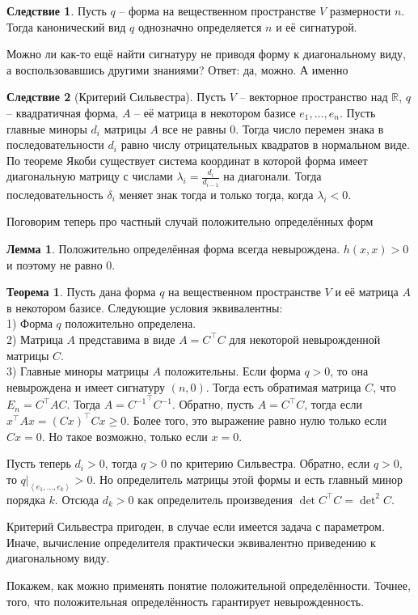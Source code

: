 \documentclass[10pt,a4paper,oneside]{book} %
\theoremstyle{definition}
\newtheorem{thm}{Теорема}
\newtheorem{lem}{Лемма}
\newtheorem{cor}{Следствие}
\newcommand{\mb}[1]{\mathbb{#1}}
\def\lan{\left\langle }
\def\ran{\right\rangle}
\def\thrm{\begin{thm}}
\def\ethrm{\end{thm}}
\def\lm{\begin{lem}}
\def\elm{\end{lem}}
\def\crl{\begin{cor}}
\def\ecrl{\end{cor}}
\begin{document}
\crl Пусть $q$ -- форма на вещественном пространстве  $V$ размерности $n$. Тогда канонический вид $q$ однозначно определяется $n$ и её  сигнатурой. 
\ecrl

Можно ли как-то ещё найти сигнатуру не приводя форму к диагональному виду, а воспользовавшись другими знаниями? Ответ: да, можно. А именно

\crl[Критерий Сильвестра]
Пусть $V$ -- векторное пространство над $\mb R$, $q$ -- квадратичная форма, $A$ -- её матрица в некотором базисе $e_1,\dots,e_n$. Пусть главные миноры  $d_i$ матрицы $A$ все не равны $0$. Тогда число перемен знака в последовательности $d_i$ равно числу отрицательных квадратов в нормальном виде.
\proof По теореме Якоби существует система координат в которой форма имеет диагональную матрицу с числами $\lambda_i=\frac{d_i}{d_{i-1}}$ на диагонали. Тогда последовательность $\delta_i$ меняет знак тогда и только тогда, когда $\lambda_i<0$.
\endproof
\ecrl

Поговорим теперь про частный случай положительно определённых форм


\lm Положительно определённая форма всегда невырождена.
\proof $h(x,x)>0$ и поэтому не равно 0.
\endproof
\elm

\thrm
Пусть дана форма $q$ на вещественном пространстве $V$ и её матрица $A$ в некотором базисе. Следующие условия эквивалентны:\\
1) Форма $q$ положительно определена.\\
2) Матрица $A$ представима в виде $A=C^{\top}C$ для некоторой невырожденной матрицы $C$.\\
3) Главные миноры матрицы $A$ положительны.
\proof
Если форма $q>0$, то она невырождена и имеет сигнатуру $(n,0)$. Тогда есть обратимая матрица $C$,  что $E_n=C^{\top}AC$. Тогда $A={C^{-1}}^{\top}C^{-1}$. Обратно, пусть $A=C^{\top}C$, тогда если $x^{\top}Ax=(Cx)^{\top}Cx\geq 0$. Более того, это выражение равно нулю только если $Cx=0$. Но такое возможно, только если $x=0$.


Пусть теперь $d_i>0$, тогда $q>0$ по критерию Сильвестра. Обратно, если $q>0$, то $q|_{\lan e_1,\dots,e_k\ran} >0$. Но определитель матрицы этой формы и есть главный минор порядка $k$. Отсюда $d_k>0$ как определитель произведения $\det C^{\top}C=\det^2 C$.
\endproof
\ethrm

Критерий Сильвестра пригоден, в случае если имеется задача с параметром. Иначе, вычисление определителя практически эквивалентно приведению к диагональному виду. 

Покажем, как можно применять понятие положительной определённости. Точнее, того, что положительная определённость гарантирует невырожденность.
\end{document}
